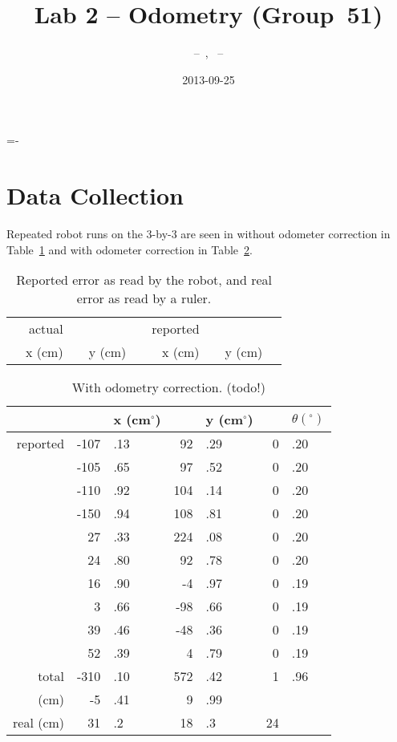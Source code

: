 \documentclass[twocolumn]{article}
\author{\bname~--~\bid, \name~--~\id}
\title{Lab 2 -- Odometry (Group~51)}
\date{2013-09-25}
\def\degree{\ensuremath{^\circ}}
\begin{document}
\abovedisplayskip=-\baselineskip

\maketitle



\section{Data Collection}

Repeated robot runs on the 3-by-3 are seen in without odometer correction in Table~\ref{a} and with odometer correction in Table~\ref{b}.

\begin{table}[htb]
\begin{center}\begin{tabular}{r r@{}l r@{}l r@{}l r@{}l}
&actual&&& &reported&&& \\
&x (cm)& &y (cm)& &x (cm)& &y (cm)& \\
\hline
\hline
\end{tabular}\end{center}
\caption{Reported error as read by the robot, and real error as read by a ruler.}
\label{a}

\end{table}

\begin{table}[htb]
\begin{center}\begin{tabular}{r r@{}l r@{}l r@{}l}
& &x (cm\degree)& &y (cm\degree)& &$\theta (\degree)$ \\
\hline
reported&-107&.13&	92&.29&	0&.20 \\
&-105&.65&	97&.52&	0&.20 \\
&-110&.92&	104&.14&	0&.20 \\
&-150&.94&	108&.81&	0&.20 \\
&27&.33&	224&.08&	0&.20 \\
&24&.80&	92&.78&	0&.20 \\
&16&.90&	-4&.97&	0&.19 \\
&3&.66&	-98&.66&	0&.19 \\
&39&.46&	-48&.36&	0&.19 \\
&52&.39&	4&.79&	0&.19 \\
\hline
total&	-310&.10&	572&.42&	1&.96 \\
(cm)&	-5&.41& 9&.99\\
real (cm)&	31&.2&	18&.3&	24
\end{tabular}\end{center}
\caption{With odometry correction. (todo!)}
\label{b}

\end{table}
\end{document}
